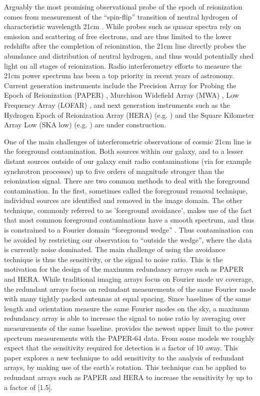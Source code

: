\documentclass[preprint2,numberedappendix,tighten,twocolappendix]{aastex6}  %
\renewcommand\[{\begin{equation}}
\renewcommand\]{\end{equation}}
\begin{document}
Arguably the most promising observational probe of the epoch of reionization
comes from measurement of the ``spin-flip'' transition of neutral
hydrogen of characteristic wavelength 21cm \cite{Furlanetto2006181,PritchardLoeb}.
While probes such as quasar spectra rely on emission and scattering
of free electrons, and are thus limited to the lower redshifts after
the completion of reionization, the 21cm line directly probes the
abundance and distribution of neutral hydrogen, and thus would potentially
shed light on all stages of reionization. Radio interferometry efforts
to measure the 21cm power spectrum has been a top priority in recent years of astronomy.
Current generation instruments include the Precision Array for Probing
the Epoch of Reionization (PAPER) \cite{Ali2015,paper32}, Murchison
Widefield Array (MWA) \cite{MWA}, Low Frequency Array (LOFAR) \cite{LOFAR},
and next generation instruments such as the Hydrogen Epoch of Reionization
Array (HERA) (e.g. \cite{HERA,HERAconfiguration,HERABEAM1,HERADISH2})
and the Square Kilometer Array Low (SKA low) (e.g. \cite{SKA1}) are
under construction. 

One of the main challenges of interferometric observations of cosmic
21cm line is the foreground contamination. Both sources within our
galaxy, and to a lesser distant sources outside of our galaxy emit
radio contaminations (via for example synchrotron processes) up to five orders of magnitude stronger than the
reionization signal. There are two common methods to deal with the
foreground contamination. In the first, sometimes called the foreground
removal technique, individual sources are identified and removed in the image domain.
The other technique, commonly referred to as 'foreground avoidance',
makes use of the fact that most common foreground contaminations have a smooth
spectrum, and thus is constrained to a Fourier domain ``foreground
wedge'' \cite{wedge1,wedge2}. Thus contamination can be avoided
by restricting our observation to ``outside the wedge'', where the data is currently noise dominated. The main
challenge of using the avoidance technique is thus the sensitivity, or
the signal to noise ratio. This is the motivation for the design of
the maximum redundancy arrays such as PAPER and HERA. While traditional
imaging arrays focus on Fourier mode uv coverage, the redundant arrays
focus on redundant measurements of the same Fourier mode
with many tightly packed antennas at equal spacing. Since baselines
of the same length and orientation measure the same Fourier modes
on the sky, a maximum redundancy array is able to increase the
signal to noise ratio by averaging over measurements of the same baseline.
\cite{Ali2015} provides the newest upper limit to the power spectrum
measurements with the PAPER-64 data. From some models we roughly expect
that the sensitivity required for detection is a factor of 10 away.
This paper explores a new technique to add sensitivity to the analysis
of redundant arrays, by making use of the earth's rotation. This technique
can be applied to redundant arrays such as PAPER and HERA to increase
the sensitivity by up to a factor of [1.5]. 
\end{document}
